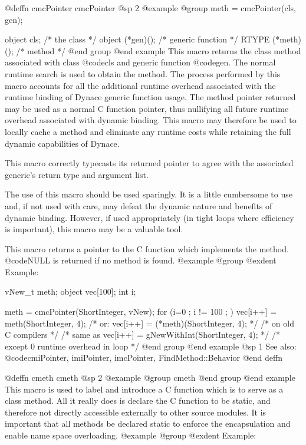 {{{{@deffn {cmcPointer} cmcPointer
@sp 2
@example
@group
meth = cmcPointer(cls, gen);

object  cls;            /*  the class           */
object  (*gen)();       /*  generic function    */
RTYPE   (*meth)();      /*  method              */
@end group
@end example
This macro returns the class method associated with class @code{cls} and
generic function @code{gen}.  The normal runtime search is used to
obtain the method.  The process performed by this macro accounts for all
the additional runtime overhead associated with the runtime binding of
Dynace generic function usage.  The method pointer returned may be used as
a normal C function pointer, thus nullifying all future runtime overhead
associated with dynamic binding.  This macro may therefore be used to
locally cache a method and eliminate any runtime costs while retaining
the full dynamic capabilities of Dynace.

This macro correctly typecasts its returned pointer to agree with
the associated generic's return type and argument list.

The use of this macro should be used sparingly.  It is a little
cumbersome to use and, if not used with care, may defeat the dynamic
nature and benefits of dynamic binding.  However, if used appropriately
(in tight loops where efficiency is important), this macro may be
a valuable tool.

This macro returns a pointer to the C function which implements the method.
@code{NULL} is returned if no method is found.
@example
@group
@exdent Example:

vNew_t    meth;
object  vec[100];
int     i;

meth = cmcPointer(ShortInteger, vNew);
for (i=0 ; i != 100 ; )
       vec[i++] = meth(ShortInteger, 4);
/* or: vec[i++] = (*meth)(ShortInteger, 4); */
       /*  on old C compilers */
/* same as vec[i++] = gNewWithInt(ShortInteger, 4);  */
/* except 0 runtime overhead in loop          */
@end group
@end example
@sp 1
See also:  @code{cmiPointer, imiPointer, imcPointer, FindMethod::Behavior}
@end deffn










@deffn {cmeth} cmeth
@sp 2
@example
@group
cmeth
@end group
@end example
This macro is used to label and introduce a C function which is to serve
as a class method.  All it really does is declare the C function to be
static, and therefore not directly accessible externally to other source
modules.  It is important that all methods be declared static to enforce
the encapsulation and enable name space overloading.
@example
@group
@exdent Example:

}}}}
